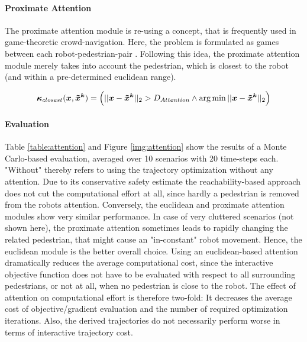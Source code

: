 \paragraph{Proximate Attention}
The proximate attention module is re-using a concept, that is frequently used in game-theoretic crowd-navigation. Here, the problem is formulated as games between each robot-pedestrian-pair \cite{Bouzat2014}\cite{Nikolaidis2017}. Following this idea, the proximate attention module merely takes into account the pedestrian, which is closest to the robot (and within a pre-determined euclidean range).

\begin{equation}
\attention_{closest}(\x, \xped[k]) = \left( ||\x - \xped[k]||_2 > D_{Attention} \land \arg \min ||\x - \xped[k]||_2 \right)
\end{equation}

\paragraph{Evaluation}
Table \ref{table:attention} and Figure \ref{img:attention} show the results of a Monte Carlo-based evaluation, averaged over 10 scenarios with 20 time-steps each. "Without" thereby refers to using the trajectory optimization without any attention. Due to its conservative safety estimate the reachability-based approach does not cut the computational effort at all, since hardly a pedestrian is removed from the robots attention. Conversely, the euclidean and proximate attention modules show very similar performance. In case of very cluttered scenarios (not shown here), the proximate attention sometimes leads to rapidly changing the related pedestrian, that might cause an "in-constant" robot movement. Hence, the euclidean module is the better overall choice.
\newline
Using an euclidean-based attention dramatically reduces the average computational cost, since the interactive objective function does not have to be evaluated with respect to all surrounding pedestrians, or not at all, when no pedestrian is close to the robot. The effect of attention on computational effort is therefore two-fold: It decreases the average cost of objective/gradient evaluation and the number of required optimization iterations. Also, the derived trajectories do not necessarily perform worse in terms of interactive trajectory cost. 


